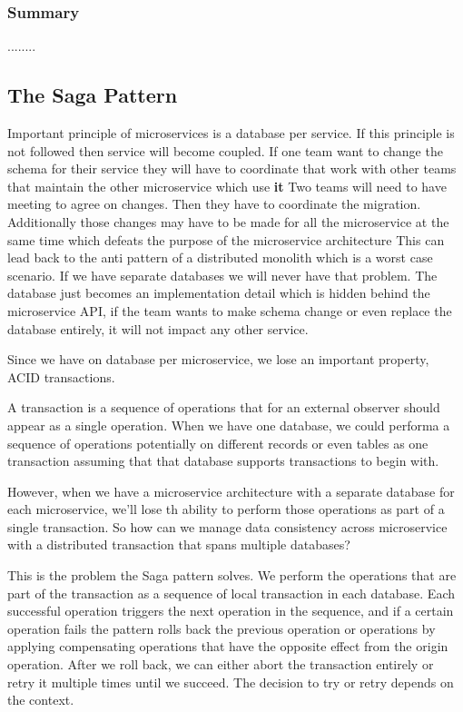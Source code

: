 \documentclass[a4paper, 11pt]{book}
\begin{document}
    \subsubsection{Summary}
    ........

    \subsection{The Saga Pattern}
    Important principle of microservices is a database per service.
    If this principle is not followed then service will become coupled.
    If one team want to change the schema for their service they will have to coordinate that work with other teams that maintain the other microservice which use \textbf{it}
    Two teams will need to have meeting to agree on changes.
    Then they have to coordinate the migration.
    Additionally those changes may have to be made for all the microservice at the same time which defeats the purpose of the microservice architecture
    This can lead back to the anti pattern of a distributed monolith which is a worst case scenario.
    If we have separate databases we will never have that problem.
    The database just becomes an implementation detail which is hidden behind the microservice API, if the team wants to make schema change or even replace the database entirely, it will not impact any other service.

    Since we have on database per microservice, we lose an important property, ACID transactions.

    A transaction is a sequence of operations that for an external observer should appear as a single operation.
    When we have one database, we could performa a sequence of operations potentially on different records or even tables as one transaction assuming that that database supports transactions to begin with.

    However, when we have a microservice architecture with a separate database for each microservice, we'll lose th ability to perform those operations as part of a single transaction.
    So how can we manage data consistency across microservice with a distributed transaction that spans multiple databases?

    This is the problem the Saga pattern solves.
    We perform the operations that are part of the transaction as a sequence of local transaction in each database.
    Each successful operation triggers the next operation in the sequence, and if a certain operation fails the pattern rolls back the previous operation or operations by applying compensating operations that have the opposite effect from the origin operation.
    After we roll back, we can either abort the transaction entirely or retry it multiple times until we succeed.
    The decision to try or retry depends on the context.
\end{document}
